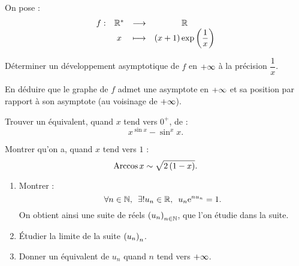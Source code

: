\begin{corr}
\end{corr}

\begin{exo}[Exercice 12]
On pose : \[\begin{array}[t]{cccc}f : & \mathbb{R}^* & \longrightarrow & \mathbb{R} \\ & x & \longmapsto & \left(x+1\right)\exp\left(\dfrac{1}{x}\right)\end{array}\]

Déterminer un développement asymptotique de \(f\) en \(+\infty\) à la précision \(\dfrac{1}{x}\).

En déduire que le graphe de \(f\) admet une asymptote en \(+\infty\) et sa position par rapport à son asymptote (au voisinage de \(+\infty\)).
\end{exo}

\begin{corr}
\end{corr}

\begin{exo}[Exercice 13]
Trouver un équivalent, quand \(x\) tend vers \(0^+\), de : \[x^{\sin x}-\sin^xx.\]
\end{exo}

\begin{corr}
\end{corr}

\begin{exo}[Exercice 14]
Montrer qu'on a, quand \(x\) tend vers \(1\) : \[\operatorname{Arccos} x\sim\sqrt{2\left(1-x\right)}.\]
\end{exo}

\begin{corr}
\end{corr}

\begin{exo}[Exercice 15]
\begin{enumerate}
\item Montrer : \[\quantifs{\forall n\in\N;\exists!u_n\in\R}u_n\e{nu_n}=1.\] On obtient ainsi une suite de réels \(\left(u_n\right)_{n\in\mathbb{N}}\), que l'on étudie dans la suite. \\

\item Étudier la limite de la suite \(\left(u_n\right)_n\). \\

\item Donner un équivalent de \(u_n\) quand \(n\) tend vers \(+\infty\).
\end{enumerate}
\end{exo}

\begin{corr}
\end{corr}

